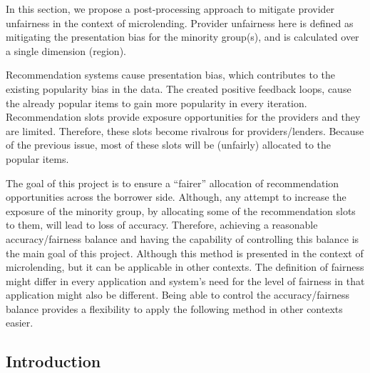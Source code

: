 \label{sec:farpfar}

In this section, we propose a post-processing approach to mitigate provider unfairness in the context of microlending. Provider unfairness here is defined as mitigating the presentation bias for the minority group(s), and is calculated over a single dimension (region). 

Recommendation systems cause presentation bias, which contributes to the existing popularity bias in the data. The created positive feedback loops, cause the already popular items to gain more popularity in every iteration. Recommendation slots provide exposure opportunities for the providers and they are limited. Therefore, these slots become rivalrous for providers/lenders. Because of the previous issue, most of these slots will be (unfairly) allocated to the popular items.
 
The goal of this project is to ensure a ``fairer'' allocation of recommendation opportunities across the borrower side. Although, any attempt to increase the exposure of the minority group, by allocating some of the recommendation slots to them, will lead to loss of accuracy. Therefore, achieving a reasonable accuracy/fairness balance and having the capability of controlling this balance is the main goal of this project. Although this method is presented in the context of microlending, but it can be applicable in other contexts. The definition of fairness might differ in every application and system's need for the level of fairness in that application might also be different. Being able to control the accuracy/fairness balance provides a flexibility to apply the following method in other contexts easier.




\subsection{Introduction}


